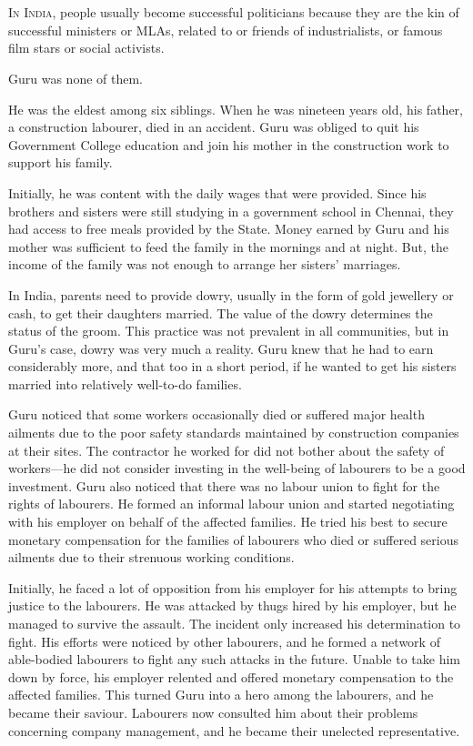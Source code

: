 \chapter{}

\lettrine{I}{n India}, people usually become successful politicians because they are the kin
of successful ministers or MLAs, related to or friends of industrialists, or famous
film stars or social activists.

Guru was none of them.

He was the eldest among six siblings. When he was nineteen years old, his
father, a construction labourer, died in an accident. Guru was obliged to quit
his Government College education and join his mother in the construction work
to support his family.

Initially, he was content with the daily wages that were provided. Since his
brothers and sisters were still studying in a government school in Chennai,
they had access to free meals provided by the State. Money earned by Guru and
his mother was sufficient to feed the family in the mornings and at night.
But, the income of the family was not enough to arrange her sisters' marriages.

In India, parents need to provide dowry, usually in the form of gold jewellery
or cash, to get their
daughters married. The value of the dowry determines the status of the groom.
This practice was not prevalent in all communities, but in Guru's case, dowry
was very much a reality. Guru knew that he had to earn considerably more, and that
too in a short period, if he wanted to get his sisters married into
relatively well-to-do families.

Guru noticed that some workers occasionally died or suffered major health
ailments due to the poor safety standards maintained by construction companies at
their sites. The contractor he worked for did not bother about the safety of
workers—he did not consider investing in the well-being of labourers to be a good
investment. Guru also noticed that there was no labour union to fight for the
rights of labourers. He formed an informal labour union and started negotiating
with his employer on behalf of the affected families. He tried his best to secure
monetary compensation for the families of labourers who died or suffered serious
ailments due to their strenuous working conditions.

Initially, he faced a lot of opposition from his employer for his attempts to
bring justice to the labourers. He was attacked by thugs hired by his employer,
but he managed to survive the assault. The incident only increased his
determination to fight. His efforts were noticed by other labourers, and he formed
a network of able-bodied labourers to fight any such attacks in the
future. Unable to take him down by force, his employer relented and offered
monetary compensation to the affected families. This turned Guru into a hero among the
labourers, and he became their saviour. Labourers now consulted him about their problems
concerning company management, and he became their unelected representative.


